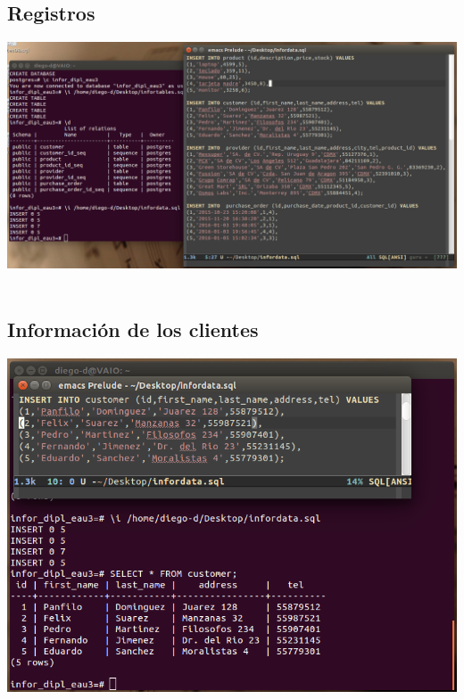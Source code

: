 \documentclass[spanish,12pt,letterpapper]{article}
\begin{document}
	\subsection{Registros}
	\begin{center}
	\includegraphics[width=1\textwidth]{./inserts}~\\[1cm] 
	\end{center}	
	
	\subsection{Información de los clientes}
	\begin{center}
	\includegraphics[width=1\textwidth]{./customers}~\\[1cm] 
	\end{center}	
	
\end{document}
